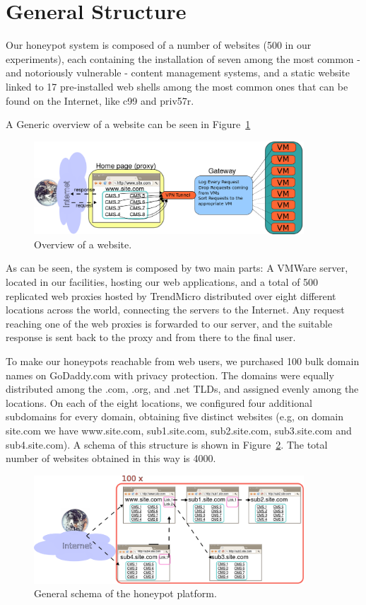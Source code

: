 \section{General Structure}

Our honeypot system is composed of a number of websites (500 in our experiments), each containing the installation of seven among the most common - and notoriously vulnerable - content management systems, and a static website linked to 17 pre-installed web shells among the most common ones that can be found on the Internet, like c99 and priv57r.

A Generic overview of a website can be seen in Figure~\ref{fig:websiteView}

\begin{figure}[tbh]
\centerline{\includegraphics[width=0.9\textwidth]{Images/websiteOverview.png}}
\caption{Overview of a website.\label{fig:websiteView}}
\end{figure}

As can be seen, the system is composed by two main parts: A VMWare server, located in our facilities, hosting our web applications, and a total of 500 replicated web proxies hosted by TrendMicro distributed over eight different locations across the world, connecting the servers to the Internet. Any request reaching one of the web proxies is forwarded to our server, and the suitable response is sent back to the proxy and from there to the final user.

To make our honeypots reachable from web users, we purchased 100 bulk domain names on GoDaddy.com with privacy protection. The domains were equally distributed among the .com, .org, and .net TLDs, and assigned evenly among the locations.
On each of the eight locations, we configured four additional subdomains for every domain, obtaining five distinct websites (e.g, on domain site.com we have www.site.com, sub1.site.com, sub2.site.com, sub3.site.com and sub4.site.com). A schema of this structure is shown in Figure~\ref{fig:genSchema}. The total number of websites obtained in this way is 4000.

\begin{figure}[tbh]
\centerline{\includegraphics[width=0.9\textwidth]{Images/GeneralSchema.png}}
\caption{General schema of the honeypot platform.\label{fig:genSchema}}
\end{figure}

